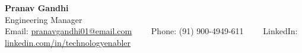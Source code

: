 \begin{center}
    {\LARGE \textbf{Pranav Gandhi}} \\
    Engineering Manager \\
    Email: \href{mailto:pranavgandhi01@email.com}{pranavgandhi01@email.com} \ \ \textbar \ \  Phone: (91) 900-4949-611 \ \ \textbar \ \  LinkedIn: \href{https://linkedin.com/in/technologyenabler}{linkedin.com/in/technologyenabler}
\end{center}

